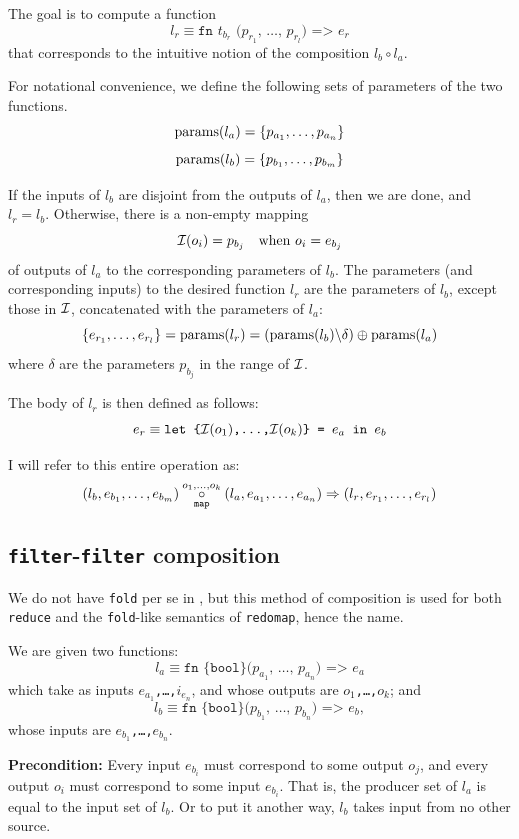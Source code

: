 The goal is to compute a function
\[
l_{r} \equiv \texttt{fn $t_{b_{r}}$ ($p_{r_{1}}$, \ldots, $p_{r_{l}}$)
=> $e_{r}$}
\]
that corresponds to the intuitive notion of the composition $l_{b}
\circ l_{a}$.

For notational convenience, we define the following sets of parameters
of the two functions.
\[
\textrm{params}(l_{a}) = \{p_{a_{1}}, \ldots, p_{a_{n}}\}
\]
\[
\textrm{params}(l_{b}) = \{p_{b_{1}}, \ldots, p_{b_{m}}\}
\]

If the inputs of $l_{b}$ are disjoint from the outputs of $l_{a}$,
then we are done, and $l_{r} = l_{b}$.  Otherwise, there is a
non-empty mapping
\[
\mathcal{I}(o_{i}) = p_{b_{j}} \quad \textrm{when $o_{i} = e_{b_{j}}$}
\]
of outputs of $l_{a}$ to the corresponding parameters of $l_{b}$.  The
parameters (and corresponding inputs) to the desired function $l_{r}$
are the parameters of $l_{b}$, except those in $\mathcal{I}$,
concatenated with the parameters of $l_{a}$:
\[
\{e_{r_{1}},\ldots,e_{r_{l}}\} = \textrm{params}(l_{r}) = (\textrm{params}(l_{b}) \backslash \delta) \oplus \textrm{params}(l_{a})
\]
where $\delta$ are the parameters $p_{b_{j}}$ in the range of
$\mathcal{I}$.

The body of $l_{r}$ is then defined as follows:
\[
e_{r} \equiv \texttt{let \{$\mathcal{I}(o_{1})$,\ldots,$\mathcal{I}(o_{k})$\} = $e_{a}$ in $e_{b}$}
\]

I will refer to this entire operation as:
\[
(l_{b},e_{b_{1}},\ldots,e_{b_{m}}) \underset{\texttt{map}}{\overset{o_1,\ldots,o_k}\circ}(l_{a},e_{a_{1}},\ldots,e_{a_{n}}) \Rightarrow (l_{r},e_{r_{1}},\ldots,e_{r_{l}})
\]

\subsection{\texttt{filter}-\texttt{filter} composition}

We do not have \texttt{fold} per se in \LO{}, but this method of
composition is used for both \texttt{reduce} and the
\texttt{fold}-like semantics of \texttt{redomap}, hence the name.

We are given two functions:
\[
l_{a}\equiv\texttt{fn \{bool\} ($p_{a_{1}}$, \ldots, $p_{a_{n}}$) => $e_{a}$}
\]
which take as inputs \texttt{$e_{a_{1}}$,\ldots,$i_{e_{n}}$}, and whose
outputs are \texttt{$o_1$,\ldots,$o_k$}; and
\[
l_{b}\equiv\texttt{fn \{bool\} ($p_{b_{1}}$, \ldots, $p_{b_{n}}$) => $e_{b}$},
\]
whose inputs are \texttt{$e_{b_{1}}$,\ldots,$e_{b_{n}}$}.

\textbf{Precondition:} Every input $e_{b_{i}}$ must correspond to some
output $o_{j}$, and every output $o_{i}$ must correspond to some input
$e_{b_{i}}$.  That is, the producer set of $l_{a}$ is equal to the
input set of $l_{b}$.  Or to put it another way, $l_{b}$ takes input
from no other source.

